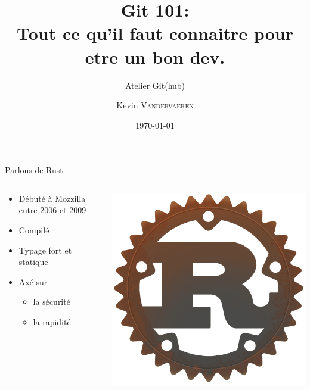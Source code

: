 \documentclass[usenames,dvipsnames]{beamer}
\title{Git 101:\\ Tout ce qu'il faut connaitre pour etre un bon dev.}
\subtitle{Atelier Git(hub)}
\date{\today}
\author{Kevin \textsc{Vandervaeren}}
\institute{ULB -- URLAB}
\begin{document}
\begin{frame}
	\titlepage
\end{frame}

\begin{frame}{Parlons de Rust}
	\begin{columns}
		\begin{column}{0.65\linewidth}
			\begin{itemize}
				\item Débuté à Mozzilla entre 2006 et 2009
				\item Compilé
				\item Typage fort et statique
				\item Axé sur 
				\begin{itemize}
					\item la sécurité
					\item la rapidité	
				\end{itemize}
			\end{itemize}
		\end{column} %
		\begin{column}{0.3\linewidth}
			\includegraphics[width=\linewidth]{Im/rust-logo.png}
		\end{column}
	\end{columns}
\end{frame}
\end{document}
